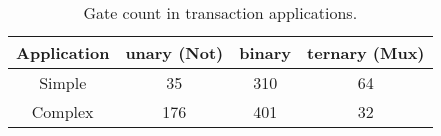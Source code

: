 \documentclass[a4paper]{article}
\begin{document}
\begin{table}[]
    \centering
    \begin{tabular}{c|c|c|c}
        Application & unary (Not) & binary & ternary (Mux) \\
        \hline
        Simple & 35 & 310 & 64 \\
        Complex & 176 & 401 & 32 
    \end{tabular}
    \caption{Gate count in transaction applications.}
    \label{tab:gate_count}
\end{table}









\end{document}
